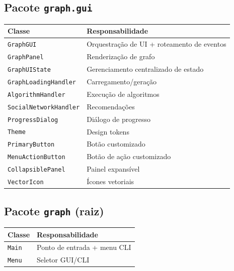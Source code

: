 \documentclass[12pt,a4paper]{article}
\begin{document}
\subsection{Pacote \texttt{graph.gui}}

\begin{table}[h]
\centering
\begin{tabular}{|l|l|}
\hline
\textbf{Classe} & \textbf{Responsabilidade} \\
\hline
\texttt{GraphGUI} & Orquestração de UI + roteamento de eventos \\
\hline
\texttt{GraphPanel} & Renderização de grafo \\
\hline
\texttt{GraphUIState} & Gerenciamento centralizado de estado \\
\hline
\texttt{GraphLoadingHandler} & Carregamento/geração \\
\hline
\texttt{AlgorithmHandler} & Execução de algoritmos \\
\hline
\texttt{SocialNetworkHandler} & Recomendações \\
\hline
\texttt{ProgressDialog} & Diálogo de progresso \\
\hline
\texttt{Theme} & Design tokens \\
\hline
\texttt{PrimaryButton} & Botão customizado \\
\hline
\texttt{MenuActionButton} & Botão de ação customizado \\
\hline
\texttt{CollapsiblePanel} & Painel expansível \\
\hline
\texttt{VectorIcon} & Ícones vetoriais \\
\hline
\end{tabular}
\end{table}

\subsection{Pacote \texttt{graph} (raiz)}

\begin{table}[h]
\centering
\begin{tabular}{|l|l|}
\hline
\textbf{Classe} & \textbf{Responsabilidade} \\
\hline
\texttt{Main} & Ponto de entrada + menu CLI \\
\hline
\texttt{Menu} & Seletor GUI/CLI \\
\hline
\end{tabular}
\end{table}

\newpage
\end{document}

